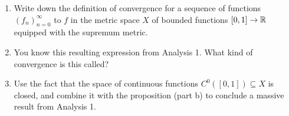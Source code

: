\begin{exercise*}
\begin{enumerate}
    \item Write down the definition of convergence for a sequence of functions $(f_n)_{n=0}^\infty$ to $f$ in the metric space $X$ of bounded functions $[0,1] \to \mathbb{R}$ equipped with the supremum metric.
    \item You know this resulting expression from Analysis 1. What kind of convergence is this called?
    \item Use the fact that the space of continuous functions $C^0([0,1]) \subseteq X$ is closed, and combine it with the  proposition (part b) to conclude a massive result from Analysis 1.
\end{enumerate}
\end{exercise*}

